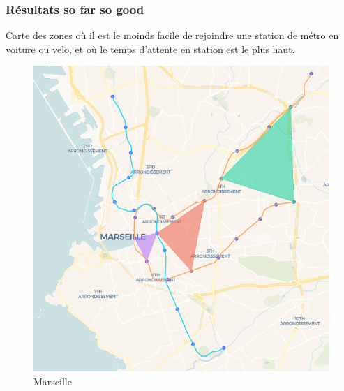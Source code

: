 \documentclass{beamer}
\begin{document}
\begin{frame}
    \frametitle{Résultats so far so good}
    Carte des zones où il est le moinds facile de rejoindre une station de métro en voiture ou velo,
    et où le temps d'attente en station est le plus haut.

    \begin{figure}[h]
        \begin{minipage}[c]{.42\linewidth}
            \centering
            \includegraphics[width=1.1\textwidth]{marseille_carte}
            \caption{Marseille}
        \end{minipage}
        \hfill
        \begin{minipage}[c]{.42\linewidth}
            \centering

\end{minipage}
\end{figure}
\end{frame}
\end{document}
